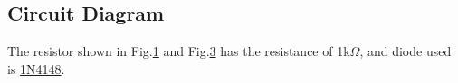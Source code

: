     \subsection{Circuit Diagram}
        \begin{figure}[h]
            \centering
            \begin{subfigure}[h]{0.45\textwidth}
                \centering
                
                \caption{}
                \label{Lab3a}
            \end{subfigure}
            \hfill
            \begin{subfigure}[h]{0.45\textwidth}
                \centering
                
                \caption{}
                \label{Lab3b}
            \end{subfigure}
        \end{figure}
        \FloatBarrier
    The resistor shown in Fig.\ref{Lab3a} and Fig.\ref{Lab3b} has the resistance of 1k$\Omega$, and diode used is \hyperref[1N4148]{1N4148}.
